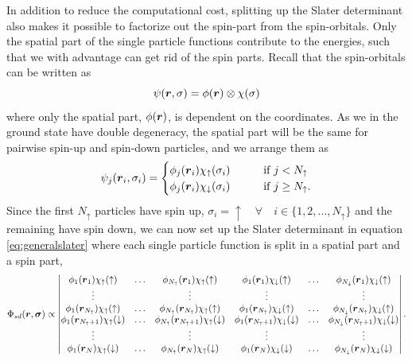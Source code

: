 In addition to reduce the computational cost, splitting up the Slater determinant also makes it possible to factorize out the spin-part from the spin-orbitals. Only the spatial part of the single particle functions contribute to the energies, such that we with advantage can get rid of the spin parts. Recall that the spin-orbitals can be written as 
\begin{equation}
\psi(\boldsymbol{{r}},\sigma)=\phi(\boldsymbol{{r}})\otimes\chi(\sigma) 
\end{equation}
where only the spatial part, $\phi(\boldsymbol{{r}})$, is dependent on the coordinates. As we in the ground state have double degeneracy, the spatial part will be the same for pairwise spin-up and spin-down particles, and we arrange them as
\begin{equation}
\psi_j(\boldsymbol{{r}}_i,\sigma_i)=
\begin{cases}
\phi_j(\boldsymbol{{r}}_i)\chi_{\uparrow}(\sigma_i)\quad\quad&\text{if } j<N_{\uparrow}\\
\phi_j(\boldsymbol{{r}}_i)\chi_{\downarrow}(\sigma_i)\quad\quad&\text{if } j\geq N_{\uparrow}.
\end{cases}
\end{equation}
Since the first $N_{\uparrow}$ particles have spin up, $\sigma_i=\uparrow\quad\forall\quad i\in\{1,2,...,N_{\uparrow}\}$ and the remaining have spin down, we can now set up the Slater determinant in equation \eqref{eq:generalslater} where each single particle function is split in a spatial part and a spin part,
\begin{equation}
\Phi_{sd}(\boldsymbol{r},\boldsymbol{{\sigma}})\propto
\begin{vmatrix}
\phi_1(\boldsymbol{r}_1)\chi_{\uparrow}(\uparrow) & \hdots & \phi_{N_{\uparrow}}(\boldsymbol{r}_1)\chi_{\uparrow}(\uparrow) & \phi_{1}(\boldsymbol{r}_1)\chi_{\downarrow}(\uparrow) & \hdots & \phi_{N_{\downarrow}}(\boldsymbol{r}_1)\chi_{\downarrow}(\uparrow)\\
\vdots & & \vdots & \vdots & & \vdots \\
\phi_1(\boldsymbol{r}_{N_{\uparrow}})\chi_{\uparrow}(\uparrow) & \hdots & \phi_{N_{\uparrow}}(\boldsymbol{r}_{N_{\uparrow}})\chi_{\uparrow}(\uparrow) & \phi_{1}(\boldsymbol{r}_{N_{\uparrow}})\chi_{\downarrow}(\uparrow) & \hdots & \phi_{N_{\downarrow}}(\boldsymbol{r}_{N_{\uparrow}})\chi_{\downarrow}(\uparrow)\\
\phi_1(\boldsymbol{r}_{N_{\uparrow}+1})\chi_{\uparrow}(\downarrow) & \hdots & \phi_{N_{\uparrow}}(\boldsymbol{r}_{N_{\uparrow}+1})\chi_{\uparrow}(\downarrow) & \phi_{1}(\boldsymbol{r}_{N_{\uparrow}+1})\chi_{\downarrow}(\downarrow) & \hdots & \phi_{N_{\downarrow}}(\boldsymbol{r}_{N_{\uparrow}+1})\chi_{\downarrow}(\downarrow)\\
\vdots & & \vdots & \vdots & & \vdots \\
\phi_1(\boldsymbol{r}_N)\chi_{\uparrow}(\downarrow) & \hdots & \phi_{N_{\uparrow}}(\boldsymbol{r}_N)\chi_{\uparrow}(\downarrow) & \phi_{1}(\boldsymbol{r}_N)\chi_{\downarrow}(\downarrow) & \hdots & \phi_{N_{\downarrow}}(\boldsymbol{r}_N)\chi_{\downarrow}(\downarrow)\\
\end{vmatrix}.
\end{equation}
